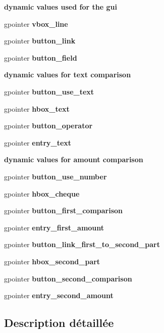 \begin{Indent}{\bf dynamic values used for the gui}\par
{\em \label{_amgrpfa4c276376680d85120c0744b7f95e25}
 }\begin{DoxyCompactItemize}
\item 
gpointer {\bf vbox\_\-line}
\item 
gpointer {\bf button\_\-link}
\item 
gpointer {\bf button\_\-field}
\end{DoxyCompactItemize}
\end{Indent}
\begin{Indent}{\bf dynamic values for text comparison}\par
{\em \label{_amgrpb228f666260cc985fa8d7ad8f23e5790}
 }\begin{DoxyCompactItemize}
\item 
gpointer {\bf button\_\-use\_\-text}
\item 
gpointer {\bf hbox\_\-text}
\item 
gpointer {\bf button\_\-operator}
\item 
gpointer {\bf entry\_\-text}
\end{DoxyCompactItemize}
\end{Indent}
\begin{Indent}{\bf dynamic values for amount comparison}\par
{\em \label{_amgrp9345ce2efd08a7f1fb3cd707842c18a4}
 }\begin{DoxyCompactItemize}
\item 
gpointer {\bf button\_\-use\_\-number}
\item 
gpointer {\bf hbox\_\-cheque}
\item 
gpointer {\bf button\_\-first\_\-comparison}
\item 
gpointer {\bf entry\_\-first\_\-amount}
\item 
gpointer {\bf button\_\-link\_\-first\_\-to\_\-second\_\-part}
\item 
gpointer {\bf hbox\_\-second\_\-part}
\item 
gpointer {\bf button\_\-second\_\-comparison}
\item 
gpointer {\bf entry\_\-second\_\-amount}
\end{DoxyCompactItemize}
\end{Indent}


\subsection{Description détaillée}


